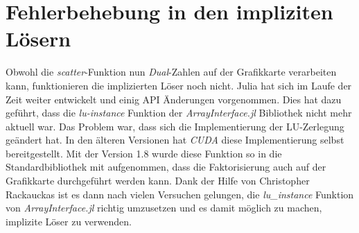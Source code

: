 
\section{ Fehlerbehebung in den impliziten Lösern } \label{sec:fehler_in_implizit_solver}

Obwohl die \textit{scatter}-Funktion nun \textit{Dual}-Zahlen auf der Grafikkarte verarbeiten kann, 
funktionieren die implizierten Löser noch nicht. 
Julia hat sich im Laufe der Zeit weiter entwickelt und einig API Änderungen vorgenommen.
Dies hat dazu geführt, dass die \textit{lu-instance} Funktion
der \textit{ArrayInterface.jl} Bibliothek \cite{arrayinterface} nicht mehr aktuell
war.
Das Problem war, dass sich die Implementierung der LU-Zerlegung geändert hat.
In den älteren Versionen hat \textit{CUDA} \cite{besard2018juliagpu} diese Implementierung selbst bereitgestellt.
Mit der Version 1.8 wurde diese Funktion so in die Standardbibliothek mit aufgenommen, 
dass die Faktorisierung auch auf der Grafikkarte durchgeführt werden kann.
Dank der Hilfe von Christopher Rackauckas \cite{chris} ist es 
dann nach vielen Versuchen gelungen, die \textit{lu\_instance} Funktion 
von \textit{ArrayInterface.jl} richtig umzusetzen \cite{firstIssue,finalIssue,testForIssue,rosenbrock}
und es damit möglich zu machen, implizite Löser zu verwenden.